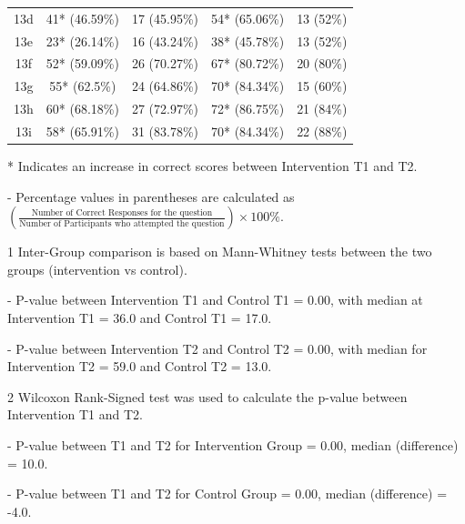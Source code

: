 \documentclass[12pt]{article}
\begin{document}
\begin{table}[htbp]
\begin{threeparttable}
\begin{tabular}{ccccc}
            13d & 41* (46.59\%) & 17 (45.95\%) & 54* (65.06\%) & 13 (52\%) \\
            13e & 23* (26.14\%) & 16 (43.24\%) & 38* (45.78\%) & 13 (52\%) \\
            13f & 52* (59.09\%) & 26 (70.27\%) & 67* (80.72\%) & 20 (80\%) \\
            13g & 55* (62.5\%) & 24 (64.86\%) & 70* (84.34\%) & 15 (60\%) \\
            13h & 60* (68.18\%) & 27 (72.97\%) & 72* (86.75\%) & 21 (84\%) \\
            13i & 58* (65.91\%) & 31 (83.78\%) & 70* (84.34\%) & 22 (88\%) \\
            \bottomrule
        \end{tabular}
        \begin{tablenotes}[flushleft]
            \footnotesize
            \item[*] Indicates an increase in correct scores between Intervention T1 and T2.
            \item[-] Percentage values in parentheses are calculated as $\left(\frac{\text{Number of Correct Responses for the question}}{\text{Number of Participants who attempted the question}}\right) \times 100\%$.
            \item[1] Inter-Group comparison is based on Mann-Whitney tests between the two groups (intervention vs control).
            \item[-] P-value between Intervention T1 and Control T1 = 0.00, with median at Intervention T1 = 36.0 and Control T1 = 17.0.
            \item[-] P-value between Intervention T2 and Control T2 = 0.00, with median for Intervention T2 = 59.0 and Control T2 = 13.0.
            \item[2] Wilcoxon Rank-Signed test was used to calculate the p-value between Intervention T1 and T2.
            \item[-] P-value between T1 and T2 for Intervention Group = 0.00, median (difference) = 10.0.
            \item[-] P-value between T1 and T2 for Control Group = 0.00, median (difference) = -4.0.
        \end{tablenotes}
    \end{threeparttable}
\end{table}
\end{document}

